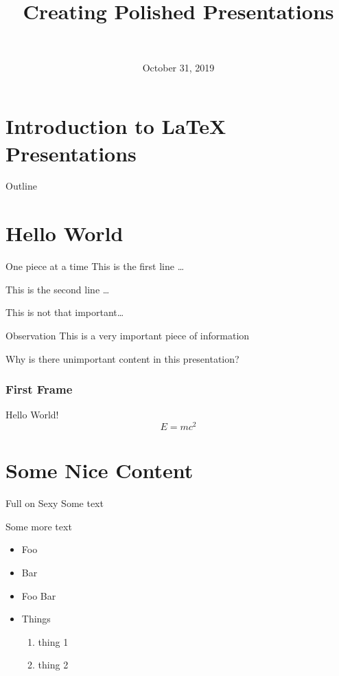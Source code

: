 \documentclass{beamer}
\title{Creating Polished Presentations}
\date{October 31, 2019}
\author{\me\\\email}
\begin{document}
\section{Introduction to \LaTeX{} Presentations}
\maketitle

\begin{frame}{Outline}
  \tableofcontents
\end{frame}

\section{Hello World}
\begin{frame}{One piece at a time}
  This is the first line \ldots

  \pause{}

  This is the second line \ldots
\end{frame}

\begin{frame}
  This is not that important\ldots

  \begin{block}{Observation}
    This is a very important piece of information
  \end{block}

  Why is there unimportant content in this presentation?
\end{frame}

\begin{frame}
  \frametitle{First Frame}
  Hello World!
  \[
    E=mc^2
  \]
\end{frame}

\section{Some Nice Content}
\begin{frame}[t]{Full on Sexy}
  Some text

  Some more text

  \begin{itemize}
    \item{Foo}
    \item{Bar}
    \item{Foo Bar}
    \item{Things
        \begin{enumerate}
          \item{thing 1}
          \item{thing 2}
        \end{enumerate}}
  \end{itemize}
\end{frame}
\end{document}
